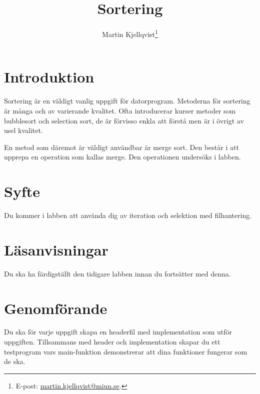 \documentclass[a4paper]{miunasgn}
\title{Sortering}
\author{Martin Kjellqvist\footnote{%
	E-post: \href{mailto:martin.kjellqvist@miun.se}{martin.kjellqvist@miun.se}.
}}
\begin{document}
\maketitle
\thispagestyle{foot}

\section{Introduktion}
\label{sec:Introduktion}
\noindent
Sortering är en väldigt vanlig uppgift för datorprogram.
Metoderna för sortering är många och av varierande kvalitet.
Ofta introducerar kurser metoder som bubblesort och selection sort, de är 
förvisso enkla att förstå men är i övrigt av usel kvalitet. 

En metod som däremot är väldigt användbar är merge sort.
Den består i att upprepa en operation som kallas merge.
Den operationen undersöks i labben.

\section{Syfte}
\label{sec:Syfte}
\noindent
Du kommer i labben att använda dig av iteration och selektion med
filhantering.

\section{Läsanvisningar}
\label{sec:Lasanvisningar}
\noindent
Du ska ha färdigställt den tidigare labben innan du fortsätter med denna.  

\section{Genomförande}
\label{sec:Genomforande}
\noindent
Du ska för varje uppgift skapa en headerfil med implementation som utför
uppgiften.
Tillsammans med header och implementation skapar du ett testprogram
vars main-funktion demonstrerar att dina funktioner fungerar som de ska.
\end{document}

